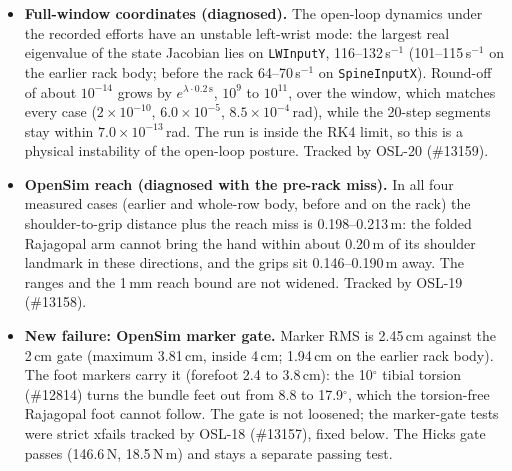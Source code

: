 \documentclass[11pt,a4paper]{article}
\begin{document}
\begin{itemize}[nosep]
\item \textbf{Full-window coordinates (diagnosed).} The open-loop dynamics
  under the recorded efforts have an unstable left-wrist mode: the largest
  real eigenvalue of the state Jacobian lies on \texttt{LWInputY},
  116--132\,s$^{-1}$ (101--115\,s$^{-1}$ on the earlier rack body; before the
  rack 64--70\,s$^{-1}$ on \texttt{SpineInputX}). Round-off of about
  $10^{-14}$ grows by $e^{\lambda\cdot0.2\,\mathrm{s}}$, $10^9$ to $10^{11}$,
  over the window, which matches every case ($2\times10^{-10}$,
  $6.0\times10^{-5}$, $8.5\times10^{-4}$\,rad), while the 20-step segments
  stay within $7.0\times10^{-13}$\,rad. The run is inside the RK4 limit, so
  this is a physical instability of the open-loop posture. Tracked by
  OSL-20 (\#13159).
\item \textbf{OpenSim reach (diagnosed with the pre-rack miss).} In all four
  measured cases (earlier and whole-row body, before and on the rack) the
  shoulder-to-grip distance plus the reach miss is 0.198--0.213\,m: the folded
  Rajagopal arm cannot bring the hand within about 0.20\,m of its shoulder
  landmark in these directions, and the grips sit 0.146--0.190\,m away. The
  ranges and the 1\,mm reach bound are not widened. Tracked by OSL-19
  (\#13158).
\item \textbf{New failure: OpenSim marker gate.} Marker RMS is 2.45\,cm
  against the 2\,cm gate (maximum 3.81\,cm, inside 4\,cm; 1.94\,cm on the
  earlier rack body). The foot markers carry it (forefoot 2.4 to 3.8\,cm):
  the 10$^\circ$ tibial torsion (\#12814) turns the bundle feet out from
  8.8 to 17.9$^\circ$, which the torsion-free Rajagopal foot cannot follow.
  The gate is not loosened; the marker-gate tests were strict xfails
  tracked by OSL-18 (\#13157), fixed below. The Hicks gate passes (146.6\,N,
  18.5\,N\,m) and stays a separate passing test.
\end{itemize}
\end{document}
